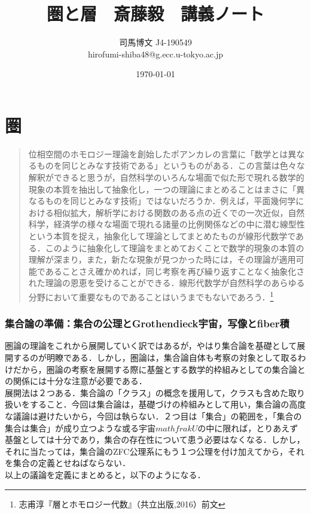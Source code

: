 \documentclass[uplatex, 12pt, a4paper, dvipdfmx]{jsarticle}
\title{圏と層　斎藤毅　講義ノート}
\author{司馬博文 J4-190549\\hirofumi-shiba48@g.ecc.u-tokyo.ac.jp}
\date{\today}
\begin{document}
\maketitle
\tableofcontents
\clearpage

\part{圏}

\begin{quotation}
    位相空間のホモロジー理論を創始したポアンカレの言葉に「数学とは異なるものを同じとみなす技術である」というものがある．この言葉は色々な解釈ができると思うが，自然科学のいろんな場面で似た形で現れる数学的現象の本質を抽出して抽象化し，一つの理論にまとめることはまさに「異なるものを同じとみなす技術」ではないだろうか．例えば，平面幾何学における相似拡大，解析学における関数のある点の近くでの一次近似，自然科学，経済学の様々な場面で現れる諸量の比例関係などの中に潜む線型性という本質を捉え，抽象化して理論としてまとめたものが線形代数学である．このように抽象化して理論をまとめておくことで数学的現象の本質の理解が深まり，また，新たな現象が見つかった時には，その理論が適用可能であることさえ確かめれば，同じ考察を再び繰り返すことなく抽象化された理論の恩恵を受けることができる．線形代数学が自然科学のあらゆる分野において重要なものであることはいうまでもないであろう．\footnote{志甫淳『層とホモロジー代数』（共立出版,2016）前文}
\end{quotation}

\section{集合論の準備：集合の公理とGrothendieck宇宙，写像とfiber積}
圏論の理論をこれから展開していく訳ではあるが，やはり集合論を基礎として展開するのが明瞭である．しかし，圏論は，集合論自体も考察の対象として取るわけだから，圏論の考察を展開する際に基盤とする数学的枠組みとしての集合論との関係には十分な注意が必要である．\\
展開法は２つある．集合論の「クラス」の概念を援用して，クラスも含めた取り扱いをすること．今回は集合論は，基礎づけの枠組みとして用い，集合論の高度な議論は避けたいから，今回は執らない．２つ目は「集合」の範囲を，「集合の集合は集合」が成り立つような或る宇宙$mathfrak{U}$の中に限れば，とりあえず基盤としては十分であり，集合の存在性について患う必要はなくなる．しかし，それに当たっては，集合論のZFC公理系にもう１つ公理を付け加えてから，それを集合の定義とせねばならない．\\
以上の議論を定義にまとめると，以下のようになる．
\end{document}
